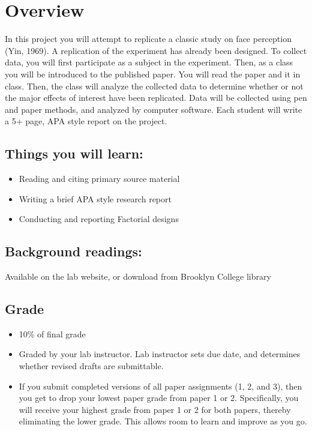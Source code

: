 

\section{Overview}

In this project you will attempt to replicate a classic study on face perception (Yin, 1969)\cite{yin_looking_1969}. A replication of the experiment has already been designed. To collect data, you will first participate as a subject in the experiment. Then, as a class you will be introduced to the published paper. You will read the paper and it in class. Then, the class will analyze the collected data to determine whether or not the major effects of interest have been replicated. Data will be collected using pen and paper methods, and analyzed by computer software. Each student will write a 5+ page, APA style report on the project.

\subsection{Things you will learn:}

\begin{itemize}
\item Reading and citing primary source material
\item Writing a brief APA style research report
\item Conducting and reporting Factorial designs
\end{itemize}

\subsection{Background readings:}

Available on the lab website, or download from Brooklyn College library 

\subsection{Grade}
\begin{itemize}
\item  10\% of final grade
\item Graded by your lab instructor. Lab instructor sets due date, and determines whether revised drafts are submittable.
\item If you submit completed versions of all paper assignments (1, 2, and 3), then you get to drop your lowest paper grade from paper 1 or 2. Specifically, you will receive your highest grade from paper 1 or 2 for both papers, thereby eliminating the lower grade. This allows room to learn and improve as you go. 
\end{itemize}


